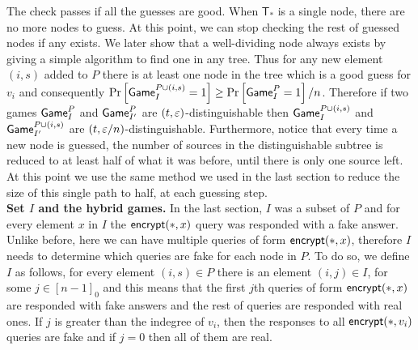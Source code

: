 \documentclass{article}
\newcommand{\encrypt}{{\sf encrypt}}
\newcommand{\game}{{\sf Game}}
\newcommand{\T}{{\mathsf T}}
\newcommand{\dgg}[2]{\game_{#1}^{#2}}
\begin{document}
The check passes if all the guesses are good. When $\T_*$ is a single node, there are no more nodes to guess. At this point, we can stop checking the rest of guessed nodes if any exists. We later show that a well-dividing node always exists by giving a simple algorithm to find one in any tree. Thus for any new element $(i,s)$ added to $P$ there is at least one node in the tree which is a good guess for $v_i$ and consequently $\prob{\game_{I}^{P\cup (i,s) }=1}\geq \prob{\dgg{I}{P}=1}/n$. Therefore if two games $ \dgg{I}{P}$ and $\dgg{I'}{P}$ are $(t,\varepsilon)$-distinguishable then $ \game_{I}^{P\cup (i,s) }$ and $\game_{I'}^{P\cup (i,s) }$ are $(t,\varepsilon/n)$-distinguishable. Furthermore, notice that every time a new node is guessed, the number of sources in the distinguishable subtree is reduced to at least half of what it was before, until there is only one source left. At this point we use the same method we used in the last section to reduce the size of this single path to half, at each guessing step. \\

  \textbf{Set $I$ and the hybrid games.} In the last section, $I$ was a subset of $P$ and for every element $x$ in $I$ the $\encrypt(*,x)$ query was responded with a fake answer. Unlike before, here we can have multiple queries of form $\encrypt(*,x)$, therefore $I$ needs to determine which queries are fake for each node in $P$. To do so, we define $I$ as follows, for every element $(i,s)\in P$ there is an element $(i,j)\in I$, for some $j\in [n-1]_0$ and this means that the first $j$th queries of form $\encrypt(*,x)$ are responded with fake answers and the rest of queries are responded with real ones. If $j$ is greater than the indegree of $v_i$, then the responses to all $\encrypt(*,v_i)$ queries are fake and if $j=0$ then all of them are real. \\ 
\end{document}

